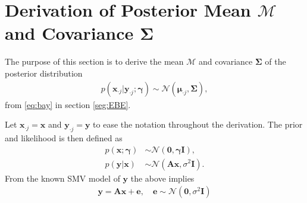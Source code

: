 \section{Derivation of Posterior Mean $\mathcal{M}$ and Covariance $\boldsymbol{\Sigma}$}\label{app_sec:mean_cov}
The purpose of this section is to derive the mean $\mathcal{M}$ and covariance $\boldsymbol{\Sigma}$ of the posterior distribution
\begin{align*}
p\left( \mathbf{x}_{\cdot j} \vert \mathbf{y}_{\cdot j} ; \boldsymbol{\gamma} \right) \sim \mathcal{N}(\boldsymbol{\mu}_{\cdot j} , \boldsymbol{\Sigma}),
\end{align*}
from \eqref{eq:bay} in section \ref{seg:EBE}. 

Let $\mathbf{x}_{\cdot j} = \mathbf{x}$ and $\mathbf{y}_{\cdot j} = \mathbf{y}$ to ease the notation throughout the derivation. The prior and likelihood is then defined as
\begin{align*}
p(\mathbf{x} ; \boldsymbol{\gamma}) &\sim \mathcal{N}(\mathbf{0}, \boldsymbol{\gamma} \mathbf{I} ), \\
p(\mathbf{y} \vert \mathbf{x}) &\sim \mathcal{N}(\mathbf{A}\mathbf{x}, \sigma^2 \mathbf{I}).
\end{align*}
From the known SMV model of $\mathbf{y}$ the above implies
\begin{align*}
\mathbf{y} = \mathbf{A} \mathbf{x} + \mathbf{e}, \quad \mathbf{e} \sim \mathcal{N}(\mathbf{0},\sigma^2 \mathbf{I}) 
\end{align*}
